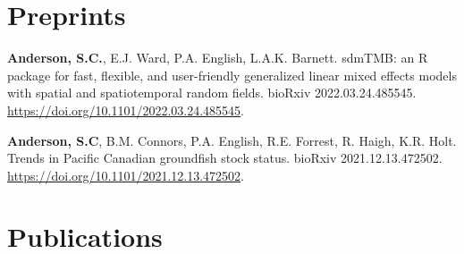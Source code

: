 \hypertarget{preprints}{%
\section{Preprints}\label{preprints}}

\begin{description}
\tightlist
\item[2022]
\textbf{Anderson, S.C.}, E.J. Ward, P.A. English, L.A.K. Barnett.
sdmTMB: an R package for fast, flexible, and user-friendly generalized
linear mixed effects models with spatial and spatiotemporal random
fields. bioRxiv 2022.03.24.485545.
\url{https://doi.org/10.1101/2022.03.24.485545}.
\item[2021]
\textbf{Anderson, S.C}, B.M. Connors, P.A. English, R.E. Forrest, R.
Haigh, K.R. Holt. Trends in Pacific Canadian groundfish stock status.
bioRxiv 2021.12.13.472502.
\url{https://doi.org/10.1101/2021.12.13.472502}.
\end{description}

\hypertarget{publications}{%
\section{Publications}\label{publications}}


